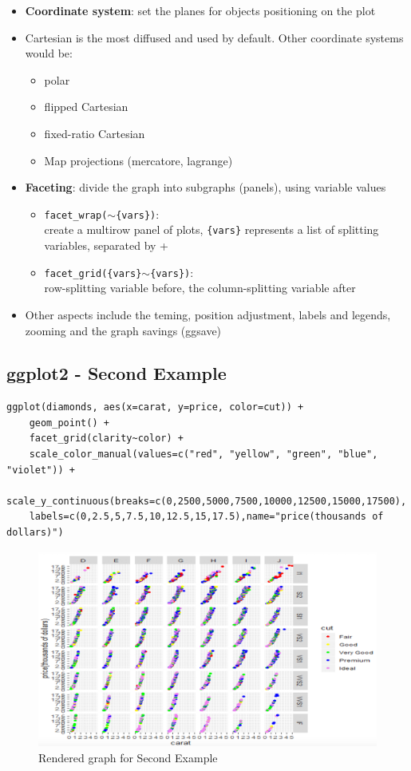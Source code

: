 \documentclass[a4paper]{article}
\begin{document}
		\begin{itemize}
			\item \textbf{Coordinate system}: set the planes for objects positioning on the plot
			\item Cartesian is the most diffused and used by default.
				Other coordinate systems would be:
				\begin{itemize}
					\item polar
					\item flipped Cartesian
					\item fixed-ratio Cartesian
					\item Map projections (mercatore, lagrange)
				\end{itemize}
			\item \textbf{Faceting}: divide the graph into subgraphs (panels), using variable values
				\begin{itemize}
					\item \texttt{facet\_wrap($\sim$\{vars\})}: \\
						create a multirow panel of plots, \texttt{\{vars\}} represents a list of splitting variables, separated by +
					\item \texttt{facet\_grid(\{vars\}$\sim$\{vars\})}: \\
					row-splitting variable before, the column-splitting variable after
				\end{itemize}
			\item Other aspects include the teming, position adjustment, labels and legends, zooming and the graph savings (ggsave)
		\end{itemize}
	
		\subsection{ggplot2 - Second Example}
		
		\begin{lstlisting}
ggplot(diamonds, aes(x=carat, y=price, color=cut)) +
	geom_point() +
	facet_grid(clarity~color) +
	scale_color_manual(values=c("red", "yellow", "green", "blue", "violet")) +
	scale_y_continuous(breaks=c(0,2500,5000,7500,10000,12500,15000,17500),
	labels=c(0,2.5,5,7.5,10,12.5,15,17.5),name="price(thousands of dollars)")
		\end{lstlisting}
		
		\begin{figure}[htb!]
			\centering
			\includegraphics[width=.8\textwidth]{img/sw03/example_02.png}
			\caption{Rendered graph for Second Example}
		\end{figure}
	
\end{document}
